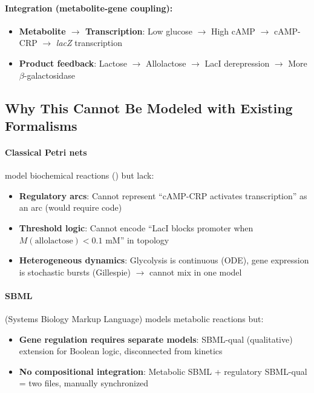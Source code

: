 \paragraph{Integration (metabolite-gene coupling):}
\begin{itemize}
    \item \textbf{Metabolite $\to$ Transcription}: Low glucose $\to$ High cAMP $\to$ cAMP-CRP $\to$ \emph{lacZ} transcription
    \item \textbf{Product feedback}: Lactose $\to$ Allolactose $\to$ LacI derepression $\to$ More $\beta$-galactosidase
\end{itemize}

\subsection{Why This Cannot Be Modeled with Existing Formalisms}
\label{subsec:lac-operon-limitations}

\paragraph{Classical Petri nets} model biochemical reactions () but lack:

\begin{itemize}
    \item \textbf{Regulatory arcs}: Cannot represent ``cAMP-CRP activates transcription'' as an arc (would require code)
    \item \textbf{Threshold logic}: Cannot encode ``LacI blocks promoter when $M(\text{allolactose}) < 0.1$ mM'' in topology
    \item \textbf{Heterogeneous dynamics}: Glycolysis is continuous (ODE), gene expression is stochastic bursts (Gillespie) $\to$ cannot mix in one model
\end{itemize}

\paragraph{SBML} (Systems Biology Markup Language) models metabolic reactions but:

\begin{itemize}
    \item \textbf{Gene regulation requires separate models}: SBML-qual (qualitative) extension for Boolean logic, disconnected from kinetics
    \item \textbf{No compositional integration}: Metabolic SBML + regulatory SBML-qual = two files, manually synchronized
\end{itemize}

